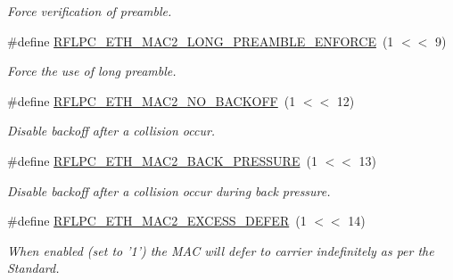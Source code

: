 \begin{DoxyCompactItemize}
\begin{DoxyCompactList}\small\item\em Force verification of preamble. \end{DoxyCompactList}\item 
\hypertarget{group__eth_ga00d4eb2cbda4eea75a3b181e5564e3c5}{\#define \hyperlink{group__eth_ga00d4eb2cbda4eea75a3b181e5564e3c5}{R\-F\-L\-P\-C\-\_\-\-E\-T\-H\-\_\-\-M\-A\-C2\-\_\-\-L\-O\-N\-G\-\_\-\-P\-R\-E\-A\-M\-B\-L\-E\-\_\-\-E\-N\-F\-O\-R\-C\-E}~(1 $<$$<$ 9)}\label{group__eth_ga00d4eb2cbda4eea75a3b181e5564e3c5}

\begin{DoxyCompactList}\small\item\em Force the use of long preamble. \end{DoxyCompactList}\item 
\hypertarget{group__eth_gacc6cfd1d3dd4479a52a2d151c2c29e8a}{\#define \hyperlink{group__eth_gacc6cfd1d3dd4479a52a2d151c2c29e8a}{R\-F\-L\-P\-C\-\_\-\-E\-T\-H\-\_\-\-M\-A\-C2\-\_\-\-N\-O\-\_\-\-B\-A\-C\-K\-O\-F\-F}~(1 $<$$<$ 12)}\label{group__eth_gacc6cfd1d3dd4479a52a2d151c2c29e8a}

\begin{DoxyCompactList}\small\item\em Disable backoff after a collision occur. \end{DoxyCompactList}\item 
\hypertarget{group__eth_ga9d675347526ed6f30f6adb3df065ea62}{\#define \hyperlink{group__eth_ga9d675347526ed6f30f6adb3df065ea62}{R\-F\-L\-P\-C\-\_\-\-E\-T\-H\-\_\-\-M\-A\-C2\-\_\-\-B\-A\-C\-K\-\_\-\-P\-R\-E\-S\-S\-U\-R\-E}~(1 $<$$<$ 13)}\label{group__eth_ga9d675347526ed6f30f6adb3df065ea62}

\begin{DoxyCompactList}\small\item\em Disable backoff after a collision occur during back pressure. \end{DoxyCompactList}\item 
\#define \hyperlink{group__eth_ga15bda0c464d98d921fad049918e75ed3}{R\-F\-L\-P\-C\-\_\-\-E\-T\-H\-\_\-\-M\-A\-C2\-\_\-\-E\-X\-C\-E\-S\-S\-\_\-\-D\-E\-F\-E\-R}~(1 $<$$<$ 14)
\begin{DoxyCompactList}\small\item\em When enabled (set to ’1’) the M\-A\-C will defer to carrier indefinitely as per the Standard. \end{DoxyCompactList}\end{DoxyCompactItemize}
